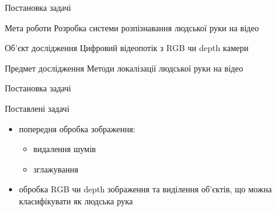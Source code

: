 \begin{frame}{Постановка задачі}
	\manimate
	\begin{block}{Мета роботи}
		Розробка системи розпізнавання людської руки на відео
	\end{block} 

	\begin{block}{Об'єкт дослідження}
		Цифровий відеопотік з RGB чи depth камери
	\end{block}
	
	\begin{block}{Предмет дослідження}
		Методи локалізації людської руки на відео
	\end{block}
\end{frame}

\begin{frame}{Постановка задачі}
	\manimate
		\begin{block}{Поставлені задачі}
			\begin{itemize}
				\item попередня обробка зображення:
				\begin{itemize}
					\item видалення шумів
					\item зглажування 
				\end{itemize}
				\item обробка RGB чи depth зображення та виділення об'єктів, що можна класифікувати як людська рука
			\end{itemize}
		\end{block}
\end{frame}